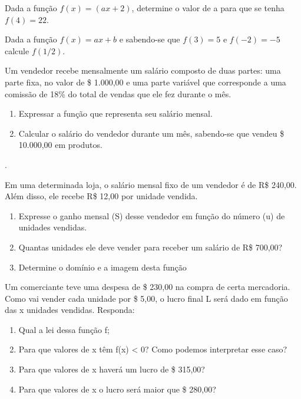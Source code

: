 			\item Dada a função $f(x) = (ax + 2)$, determine o valor de a para que se tenha $f(4) = 22$.
			\item Dada a função $f(x) = ax + b$ e sabendo-se que $f(3) = 5$ e $f(-2) = -5$ calcule $f(1/2)$.
			\item Um vendedor recebe mensalmente um salário composto de duas partes: uma parte fixa, no valor de \$ 1.000,00 e uma parte variável que corresponde a uma comissão de 18\% do total de vendas que ele fez durante o mês.
				\begin{enumerate}
					\item Expressar a função que representa seu salário mensal.
					\item Calcular o salário do vendedor durante um mês, sabendo-se que vendeu \$ 10.000,00 em produtos.
				\end{enumerate}. 
			\item Em uma determinada loja, o salário mensal fixo de um vendedor é de R\$ 240,00. Além disso, ele recebe R\$ 12,00 por unidade vendida.
		\begin{enumerate}
			\item Expresse o ganho mensal (S) desse vendedor em função do número (u) de unidades vendidas.
			\item Quantas unidades ele deve vender para receber um salário de R\$ 700,00?
			\item Determine o domínio e a imagem desta função
		\end{enumerate}
		
		\item Um comerciante teve uma despesa de \$ 230,00 na compra de certa mercadoria. Como vai vender cada unidade por \$ 5,00, o lucro final L será dado em função das x unidades vendidas. Responda:
		\begin{enumerate}
		 	\item Qual a lei dessa função f;
		 	\item Para que valores de x têm f(x) < 0? Como podemos interpretar esse caso?
		 	\item Para que valores de x haverá um lucro de \$ 315,00?
		 	\item Para que valores de x o lucro será maior que \$ 280,00?
		\end{enumerate}
		
